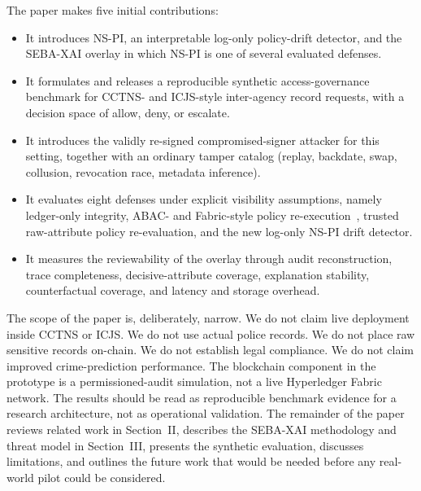 The paper makes five initial contributions:
\begin{itemize}
  \item It introduces NS-PI, an interpretable log-only policy-drift
        detector, and the SEBA-XAI overlay in which NS-PI is one of
        several evaluated defenses.
  \item It formulates and releases a reproducible synthetic
        access-governance benchmark for CCTNS- and ICJS-style inter-agency
        record requests, with a decision space of allow, deny, or
        escalate.
  \item It introduces the validly re-signed compromised-signer attacker
        for this setting, together with an ordinary tamper catalog
        (replay, backdate, swap, collusion, revocation race, metadata
        inference).
  \item It evaluates eight defenses under explicit visibility
        assumptions, namely ledger-only integrity, ABAC- and Fabric-style
        policy re-execution~\cite{zhao_fabric_abac_2022,nist_abac_2014},
        trusted raw-attribute policy re-evaluation, and the new
        log-only NS-PI drift detector.
  \item It measures the reviewability of the overlay through audit
        reconstruction, trace completeness, decisive-attribute coverage,
        explanation stability, counterfactual coverage, and latency and
        storage overhead.
\end{itemize}

The scope of the paper is, deliberately, narrow. We do not claim live
deployment inside CCTNS or ICJS. We do not use actual police records. We
do not place raw sensitive records on-chain. We do not establish legal
compliance. We do not claim improved crime-prediction performance. The
blockchain component in the prototype is a permissioned-audit simulation,
not a live Hyperledger Fabric network. The results should be read as
reproducible benchmark evidence for a research architecture, not as
operational validation. The remainder of the paper reviews related work in
Section~II, describes the SEBA-XAI methodology and threat model in
Section~III, presents the synthetic evaluation, discusses limitations, and
outlines the future work that would be needed before any real-world pilot
could be considered.
